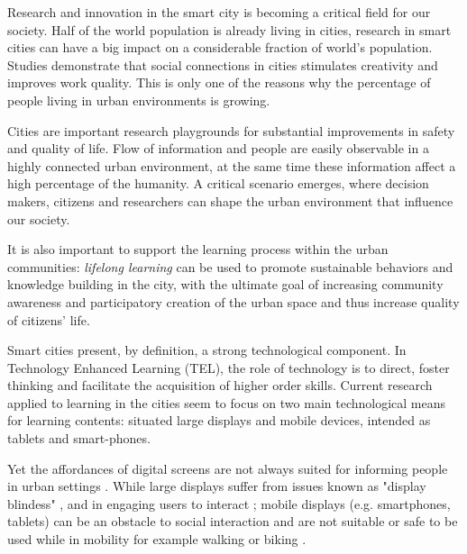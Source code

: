 Research and innovation in the smart city is becoming a critical field for our society. Half of the world population is already living in cities, research in smart cities can have a big impact on a considerable fraction of world's population.
Studies demonstrate that social connections in cities stimulates creativity and improves work quality\cite{florida_cities_2005}. This is only one of the reasons why the percentage of people living in urban environments is growing.

Cities are important research playgrounds for substantial improvements in safety and quality of life.
Flow of information and people are easily observable in a highly connected urban environment, at the same time these information affect a high percentage of the humanity. A critical scenario emerges, where decision makers, citizens and researchers can shape the urban environment that influence our society.

It is also important to support the learning process within the urban communities: \textit{lifelong learning} can be used to promote sustainable behaviors and knowledge building in the city, with the ultimate goal of increasing community awareness and participatory creation of the urban space and thus increase quality of citizens' life.

Smart cities present, by definition, a strong technological component.
In Technology Enhanced Learning (TEL), the role of technology is to direct, foster thinking and facilitate the acquisition of higher order skills\cite{goodyear_technologyenhanced_2010}.
Current research applied to learning in the cities seem to focus on two main technological means for learning contents: situated large displays and mobile devices, intended as tablets and smart-phones\cite{luff_mobility_1998}.

Yet the affordances of digital screens are not always suited for informing people in urban settings \cite{koeman_what_2014}. While large displays suffer from issues known as "display blindess" \cite{}, and in engaging users to interact \cite{}; mobile displays (e.g. smartphones, tablets) can be an obstacle to social interaction and are not suitable or safe to be used while in mobility for example walking or biking \cite{}. 

